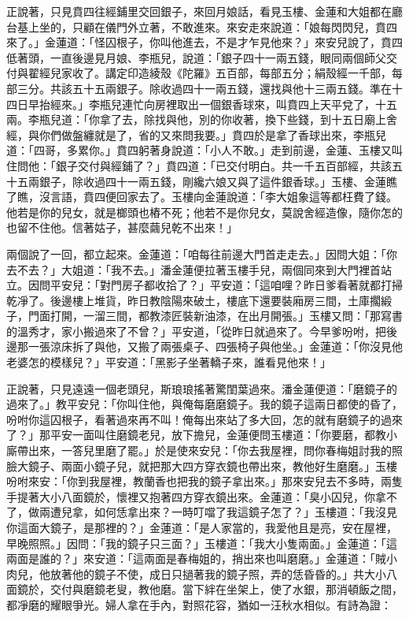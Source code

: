 正說著，只見賁四往經鋪里交回銀子，來回月娘話，看見玉樓、金蓮和大姐都在廳台基上坐的，只顧在儀門外立著，不敢進來。來安走來說道：「娘每閃閃兒，賁四來了。」金蓮道：「怪囚根子，你叫他進去，不是才乍見他來？」來安兒說了，賁四低著頭，一直後邊見月娘、李瓶兒，說道：「銀子四十一兩五錢，眼同兩個師父交付與翟經兒家收了。講定印造綾殼《陀羅》五百部，每部五分；絹殼經一千部，每部三分。共該五十五兩銀子。除收過四十一兩五錢，還找與他十三兩五錢。準在十四日早抬經來。」李瓶兒連忙向房裡取出一個銀香球來，叫賁四上天平兌了，十五兩。李瓶兒道：「你拿了去，除找與他，別的你收著，換下些錢，到十五日廟上舍經，與你們做盤纏就是了，省的又來問我要。」賁四於是拿了香球出來，李瓶兒道：「四哥，多累你。」賁四躬著身說道：「小人不敢。」走到前邊，金蓮、玉樓又叫住問他：「銀子交付與經鋪了？」賁四道：「已交付明白。共一千五百部經，共該五十五兩銀子，除收過四十一兩五錢，剛纔六娘又與了這件銀香球。」玉樓、金蓮瞧了瞧，沒言語，賁四便回家去了。玉樓向金蓮說道：「李大姐象這等都枉費了錢。他若是你的兒女，就是榔頭也樁不死；他若不是你兒女，莫說舍經造像，隨你怎的也留不住他。信著姑子，甚麼繭兒乾不出來！」

兩個說了一回，都立起來。金蓮道：「咱每往前邊大門首走走去。」因問大姐：「你去不去？」大姐道：「我不去。」潘金蓮便拉著玉樓手兒，兩個同來到大門裡首站立。因問平安兒：「對門房子都收拾了？」平安道：「這咱哩？昨日爹看著就都打掃乾凈了。後邊樓上堆貨，昨日教陰陽來破土，樓底下還要裝廂房三間，土庫擱緞子，門面打開，一溜三間，都教漆匠裝新油漆，在出月開張。」玉樓又問：「那寫書的溫秀才，家小搬過來了不曾？」平安道，「從昨日就過來了。今早爹吩咐，把後邊那一張涼床拆了與他，又搬了兩張桌子、四張椅子與他坐。」金蓮道：「你沒見他老婆怎的模樣兒？」平安道：「黑影子坐著轎子來，誰看見他來！」

正說著，只見遠遠一個老頭兒，斯琅琅搖著驚閨葉過來。潘金蓮便道：「磨鏡子的過來了。」教平安兒：「你叫住他，與俺每磨磨鏡子。我的鏡子這兩日都使的昏了，吩咐你這囚根子，看著過來再不叫！俺每出來站了多大回，怎的就有磨鏡子的過來了？」那平安一面叫住磨鏡老兒，放下擔兒，金蓮便問玉樓道：「你要磨，都教小廝帶出來，一答兒里磨了罷。」於是使來安兒：「你去我屋裡，問你春梅姐討我的照臉大鏡子、兩面小鏡子兒，就把那大四方穿衣鏡也帶出來，教他好生磨磨。」玉樓吩咐來安：「你到我屋裡，教蘭香也把我的鏡子拿出來。」那來安兒去不多時，兩隻手提著大小八面鏡於，懷裡又抱著四方穿衣鏡出來。金蓮道：「臭小囚兒，你拿不了，做兩遭兒拿，如何恁拿出來？一時叮噹了我這鏡子怎了？」玉樓道：「我沒見你這面大鏡子，是那裡的？」金蓮道：「是人家當的，我愛他且是亮，安在屋裡，早晚照照。」因問：「我的鏡子只三面？」玉樓道：「我大小隻兩面。」金蓮道：「這兩面是誰的？」來安道：「這兩面是春梅姐的，捎出來也叫磨磨。」金蓮道：「賊小肉兒，他放著他的鏡子不使，成日只撾著我的鏡子照，弄的恁昏昏的。」共大小八面鏡於，交付與磨鏡老叟，教他磨。當下絆在坐架上，使了水銀，那消頓飯之間，都凈磨的耀眼爭光。婦人拿在手內，對照花容，猶如一汪秋水相似。有詩為證：


